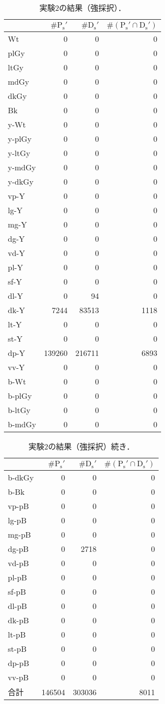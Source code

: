 \documentclass[uplatex,paper=a4,fontsize=4.0truemm,jafontsize=4.0truemm,head_space=30.0truemm,foot_space=30.0truemm,baselineskip=8.0truemm,line_length=40zw,gutter=25.0truemm,oneside,openany,fleqn,hanging_panctuation,open_bracket_pos=nibu_tentsuki,dvipdfmx,jis2004,book,titlepage]{jlreq}
\theoremstyle{mystyle}
\newcommand{\zwspace}{\hspace{1zw}\relax}
\newcommand{\captiondot}[1]{\caption{#1．}}
\newcommand{\tableinput}[4]{\begin{table}[tbp]\centering\captiondot{#3}\label{tab:#4}\begin{tabular}{#1}#2\end{tabular}\end{table}}
\newcommand{\parentheses}[1]{\left(#1\right)}
\begin{document}
			\clearpage
			\tableinput{l|rrr}{ & \(\#\textrm{P}_\textrm{s}'\) & \(\#\textrm{D}_\textrm{s}'\) & \(\#\parentheses{\textrm{P}_\textrm{s}'\cap\textrm{D}_\textrm{s}'}\) \\ \hline
				Wt & 0 & 0 & 0 \\
				plGy & 0 & 0 & 0 \\
				ltGy & 0 & 0 & 0 \\
				mdGy & 0 & 0 & 0 \\
				dkGy & 0 & 0 & 0 \\
				Bk & 0 & 0 & 0 \\
				y-Wt & 0 & 0 & 0 \\
				y-plGy & 0 & 0 & 0 \\
				y-ltGy & 0 & 0 & 0 \\
				y-mdGy & 0 & 0 & 0 \\
				y-dkGy & 0 & 0 & 0 \\
				vp-Y & 0 & 0 & 0 \\
				lg-Y & 0 & 0 & 0 \\
				mg-Y & 0 & 0 & 0 \\
				dg-Y & 0 & 0 & 0 \\
				vd-Y & 0 & 0 & 0 \\
				pl-Y & 0 & 0 & 0 \\
				sf-Y & 0 & 0 & 0 \\
				dl-Y & 0 & 94 & 0 \\
				dk-Y & 7244 & 83513 & 1118 \\
				lt-Y & 0 & 0 & 0 \\
				st-Y & 0 & 0 & 0 \\
				dp-Y & 139260 & 216711 & 6893 \\
				vv-Y & 0 & 0 & 0 \\
				b-Wt & 0 & 0 & 0 \\
				b-plGy & 0 & 0 & 0 \\
				b-ltGy & 0 & 0 & 0 \\
				b-mdGy & 0 & 0 & 0}{実験2の結果（強採択）}{result23}
			\tableinput{l|rrr}{ & \(\#\textrm{P}_\textrm{s}'\) & \(\#\textrm{D}_\textrm{s}'\) & \(\#\parentheses{\textrm{P}_\textrm{s}'\cap\textrm{D}_\textrm{s}'}\) \\ \hline
				b-dkGy & 0 & 0 & 0 \\
				b-Bk & 0 & 0 & 0 \\
				vp-pB & 0 & 0 & 0 \\
				lg-pB & 0 & 0 & 0 \\
				mg-pB & 0 & 0 & 0 \\
				dg-pB & 0 & 2718 & 0 \\
				vd-pB & 0 & 0 & 0 \\
				pl-pB & 0 & 0 & 0 \\
				sf-pB & 0 & 0 & 0 \\
				dl-pB & 0 & 0 & 0 \\
				dk-pB & 0 & 0 & 0 \\
				lt-pB & 0 & 0 & 0 \\
				st-pB & 0 & 0 & 0 \\
				dp-pB & 0 & 0 & 0 \\
				vv-pB & 0 & 0 & 0 \\ \hline
				合計 & 146504 & 303036 & 8011}{実験2の結果（強採択）\zwspace 続き}{result26}
\end{document}
